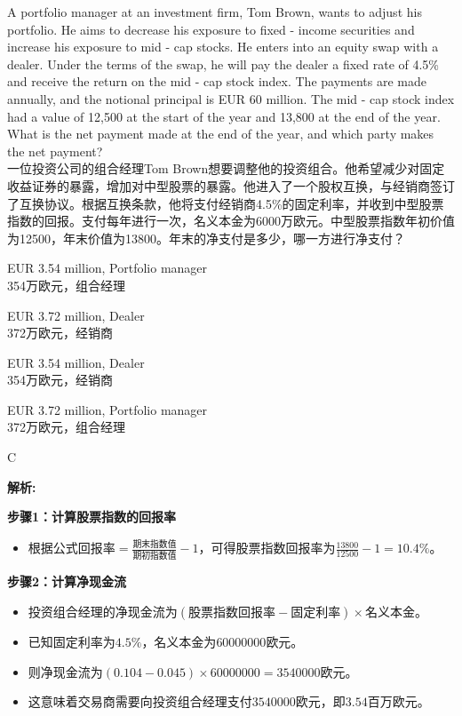 \documentclass{article}
\newcounter{question} %
\newenvironment{explanation}
{\textbf{解析:}\par}
{\par}
\begin{document}
\begin{question}
    A portfolio manager at an investment firm, Tom Brown, wants to adjust his portfolio. He aims to decrease his exposure to fixed - income securities and increase his exposure to mid - cap stocks. He enters into an equity swap with a dealer. Under the terms of the swap, he will pay the dealer a fixed rate of 4.5\% and receive the return on the mid - cap stock index. The payments are made annually, and the notional principal is EUR 60 million. The mid - cap stock index had a value of 12,500 at the start of the year and 13,800 at the end of the year. What is the net payment made at the end of the year, and which party makes the net payment?
    \\一位投资公司的组合经理Tom Brown想要调整他的投资组合。他希望减少对固定收益证券的暴露，增加对中型股票的暴露。他进入了一个股权互换，与经销商签订了互换协议。根据互换条款，他将支付经销商4.5\%的固定利率，并收到中型股票指数的回报。支付每年进行一次，名义本金为6000万欧元。中型股票指数年初价值为12500，年末价值为13800。年末的净支付是多少，哪一方进行净支付？
    \end{question}
    
    \begin{choices}
        \item EUR 3.54 million, Portfolio manager\\354万欧元，组合经理
        \item EUR 3.72 million, Dealer\\372万欧元，经销商
        \item EUR 3.54 million, Dealer\\354万欧元，经销商
        \item EUR 3.72 million, Portfolio manager\\372万欧元，组合经理
    \end{choices}
    
    \begin{correctanswer}
        C
    \end{correctanswer}
    
    \begin{explanation}
    \textbf{步骤1：计算股票指数的回报率}
    \begin{itemize}
        \item 根据公式\(回报率=\frac{期末指数值}{期初指数值}-1\)，可得股票指数回报率为\(\frac{13800}{12500}-1 = 10.4\%\)。
    \end{itemize}
    \textbf{步骤2：计算净现金流}
    \begin{itemize}
        \item 投资组合经理的净现金流为\((股票指数回报率 - 固定利率)\times 名义本金\)。
        \item 已知固定利率为\(4.5\%\)，名义本金为\(60000000\)欧元。
        \item 则净现金流为\((0.104 - 0.045)\times60000000=3540000\)欧元。
        \item 这意味着交易商需要向投资组合经理支付\(3540000\)欧元，即\(3.54\)百万欧元。
    \end{itemize}
    \end{explanation}
    
\end{document}
